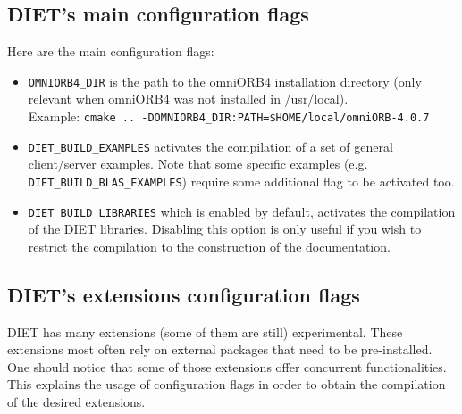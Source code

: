 \subsection{DIET's main configuration flags}

Here are the main configuration flags:
\begin{itemize}
\item
  \verb+OMNIORB4_DIR+ is the path to the omniORB4 installation directory
  (only relevant when omniORB4 was not installed in /usr/local).\\
  Example: \verb+cmake .. -DOMNIORB4_DIR:PATH=$HOME/local/omniORB-4.0.7+

\item
  \verb+DIET_BUILD_EXAMPLES+ activates the compilation of a set of
  general client/server examples. Note that some specific examples
  (e.g. \verb+DIET_BUILD_BLAS_EXAMPLES+) require some additional flag
  to be activated too.

\item
  \verb+DIET_BUILD_LIBRARIES+ which is enabled by default, activates the
  compilation of the DIET libraries.
  Disabling this option is only useful if you wish to restrict the
  compilation to the construction of the documentation.
\end{itemize}

\subsection{DIET's extensions configuration flags}

DIET has many extensions (some of them are still) experimental. These
extensions most often rely on external packages that need to be pre-installed.
One should notice that some of those extensions offer concurrent
functionalities.
This explains the usage of configuration flags in order to obtain
the compilation of the desired extensions.

